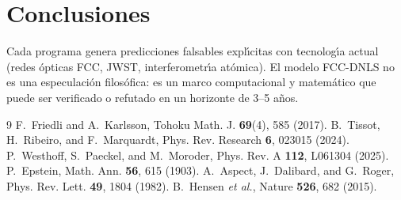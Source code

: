 \documentclass[twocolumn]{article}
\begin{document}
\section{Conclusiones}

Cada programa genera predicciones falsables expl\'{\i}citas con
tecnolog\'{\i}a actual (redes \'opticas FCC, JWST, interferometr\'{\i}a
at\'omica). El modelo FCC-DNLS no es una especulaci\'on
filos\'ofica: es un marco computacional y matem\'atico que puede
ser verificado o refutado en un horizonte de 3--5 a\~nos.

\begin{thebibliography}{9}
 F.~Friedli and A.~Karlsson, Tohoku Math. J.
  {\bf 69}(4), 585 (2017).
 B.~Tissot, H.~Ribeiro, and F.~Marquardt,
  Phys. Rev. Research {\bf 6}, 023015 (2024).
 P.~Westhoff, S.~Paeckel, and M.~Moroder,
  Phys. Rev. A {\bf 112}, L061304 (2025).
 P.~Epstein, Math. Ann. {\bf 56}, 615 (1903).
 A.~Aspect, J.~Dalibard, and G.~Roger,
  Phys. Rev. Lett. {\bf 49}, 1804 (1982).
 B.~Hensen {\it et al.}, Nature {\bf 526},
  682 (2015).
\end{thebibliography}
\end{document}
